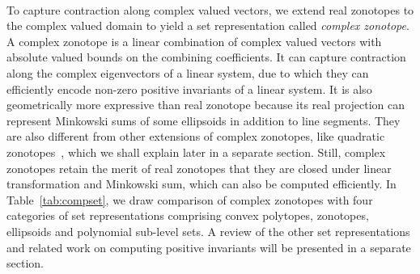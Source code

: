 \begin{table}
\caption{Comparison of set representations}~\label{tab:compset}
\end{table}


To capture contraction along complex valued vectors, we extend real
zonotopes to the complex valued domain to yield a set representation
called {\it complex zonotope}.  A complex zonotope is a linear
combination of complex valued vectors with absolute valued bounds on
the combining coefficients.  It can capture contraction along the
complex eigenvectors of a linear system, due to which they can
efficiently encode non-zero positive invariants of a linear system.
It is also geometrically more expressive than real zonotope because
its real projection can represent Minkowski sums of some ellipsoids in
addition to line segments.  They are also different from other
extensions of complex zonotopes, like quadratic
zonotopes~\cite{DBLP:conf/aplas/AdjeGW15}, which we shall explain
later in a separate section.  Still, complex zonotopes retain the
merit of real zonotopes that they are closed under linear
transformation and Minkowski sum, which can also be computed
efficiently.  In Table~\ref{tab:compset}, we draw comparison of
complex zonotopes with four categories of set representations
comprising convex polytopes, zonotopes, ellipsoids and polynomial
sub-level sets.  A review of the other set representations and related
work on computing positive invariants will be presented in a separate
section.

